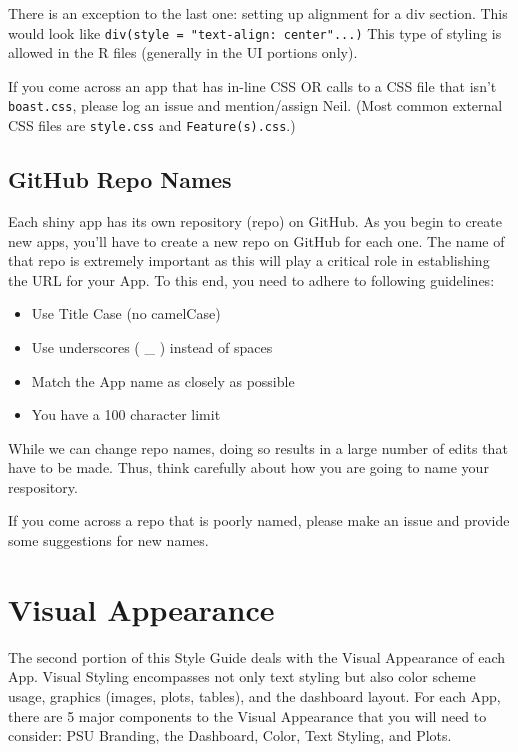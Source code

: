 \documentclass[]{book}
\providecommand{\tightlist}{%
  \setlength{\itemsep}{0pt}\setlength{\parskip}{0pt}}
\begin{document}
There is an exception to the last one: setting up alignment for a div section. This would look like \texttt{div(style\ =\ "text-align:\ center"...)} This type of styling is allowed in the R files (generally in the UI portions only).

If you come across an app that has in-line CSS OR calls to a CSS file that isn't \texttt{boast.css}, please log an issue and mention/assign Neil. (Most common external CSS files are \texttt{style.css} and \texttt{Feature(s).css}.)

\hypertarget{github-repo-names}{%
\section{GitHub Repo Names}\label{github-repo-names}}

Each shiny app has its own repository (repo) on GitHub. As you begin to create new apps, you'll have to create a new repo on GitHub for each one. The name of that repo is extremely important as this will play a critical role in establishing the URL for your App. To this end, you need to adhere to following guidelines:

\begin{itemize}
\tightlist
\item
  Use Title Case (no camelCase)
\item
  Use underscores ( \_ ) instead of spaces
\item
  Match the App name as closely as possible
\item
  You have a 100 character limit
\end{itemize}

While we can change repo names, doing so results in a large number of edits that have to be made. Thus, think carefully about how you are going to name your respository.

If you come across a repo that is poorly named, please make an issue and provide some suggestions for new names.

\hypertarget{visualAppearance}{%
\chapter{Visual Appearance}\label{visualAppearance}}

The second portion of this Style Guide deals with the Visual Appearance of each App. Visual Styling encompasses not only text styling but also color scheme usage, graphics (images, plots, tables), and the dashboard layout. For each App, there are 5 major components to the Visual Appearance that you will need to consider: PSU Branding, the Dashboard, Color, Text Styling, and Plots.
\end{document}
